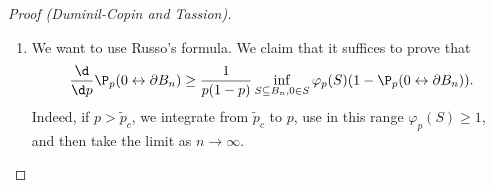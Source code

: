 \documentclass[a4paper]{article}
\begin{document}
\begin{proof}[Proof (Duminil-Copin and Tassion)]
\begin{enumerate}
      Now if we have an open path from $0$ to $\partial B_{kL}$, we let $x$ be the last element on the path that lies in $\mathcal{C}$. We can then replace the path up to $x$ by a path that lies entirely in $S$, by assumption. This is then a path that lies in $\mathcal{C}$ up to $x$, then takes an edge on $\partial S$, and then lies entirely outside of $\mathcal{C}^c$. Thus,
      \[
        \P_p(0 \leftrightarrow \partial B_{kL}) \leq \sum_{A \subseteq S, 0\in A} \sum_{(x, y) \in \partial A} \P_p(0 \overset{A}{\leftrightarrow} x, (x, t)\text{ is open}, \mathcal{C} = A, y \overset{A^C}{\leftrightarrow} \partial B_{kL}).
      \]
      Now observe that the events $\{\mathcal{C} = A, 0 \overset{S}{\leftrightarrow}\}$, $\{(x, y)\text{ is open}\}$ and $\{y \overset{A^c}{\leftrightarrow} \partial B_{kL}\}$ are independent. So we obtain
      \[
        \P_p(0 \leftrightarrow \partial B_{kL}) \leq \sum_{A \subseteq S, 0 \in A} \sum_{(x, y) \in \partial S} \P_p(0\overset{S}{\leftrightarrow} x, \mathcal{C} = A) \cdot p \cdot \P_p(y \overset{A^c}{\leftrightarrow} \partial B_{kL}).
      \]
      Since we know that $y \in B_L$, we can bound
      \[
        \P_p(y \overset{A^c}{\leftrightarrow}\partial B_{kL}) \leq \P_p(0 \leftrightarrow \partial B_{(k - 1)L}).
      \]
      So we have
      \begin{align*}
        \P_p(0 \leftrightarrow \partial B_{kL}) &\leq \P_p(0 \leftrightarrow \partial B_{(k-1)L}) p \sum_{A \subseteq S, 0 \in A} \sum_{(x, y) \in \partial S} \P_p(0 \overset{S}{x} x, \mathcal{C} = A)\\
        &= \P_p(0 \leftrightarrow \partial B_{(k - 1)L}) \cdot p \cdot \sum_{(x, y) \in \partial S} \P_p(0 \overset{S}{\leftrightarrow} x)\\
        &= \P_p(0 \leftrightarrow \partial B_{(k - 1)L}) \varphi_p(S).
      \end{align*}
      Iterating, we obtain the deseired result.
    \item We want to use Russo's formula. We claim that it suffices to prove that
      \[
        \frac{\d}{\d p} \P_p(0 \leftrightarrow \partial B_n) \geq \frac{1}{p(1 - p)} \inf_{S \subseteq B_n, 0 \in S} \varphi_p(S) (1 - \P_p(0 \leftrightarrow \partial B_n)).
      \]
      Indeed, if $p > \tilde{p}_c$, we integrate from $\tilde{p}_c$ to $p$, use in this range $\varphi_p(S) \geq 1$, and then take the limit as $n \to \infty$.


\end{enumerate}
\end{proof}
\end{document}
